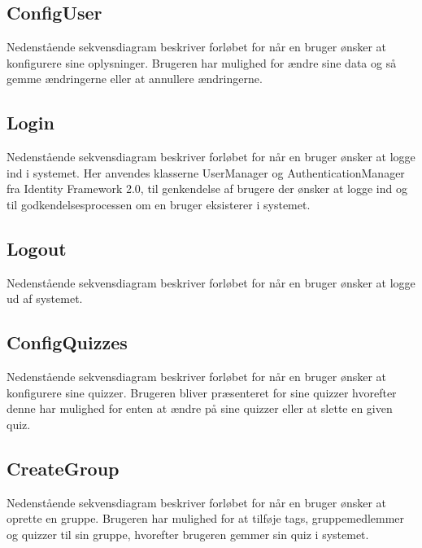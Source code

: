 
\subsection*{ConfigUser}
Nedenstående sekvensdiagram beskriver forløbet for når en bruger ønsker at konfigurere sine oplysninger. Brugeren har mulighed for ændre sine data og så gemme ændringerne eller at annullere ændringerne.


\subsection*{Login}
Nedenstående sekvensdiagram beskriver forløbet for når en bruger ønsker at logge ind i systemet. Her anvendes klasserne UserManager og AuthenticationManager fra Identity Framework 2.0, til genkendelse af brugere der ønsker at logge ind og til godkendelsesprocessen om en bruger eksisterer i systemet.


\subsection*{Logout}
Nedenstående sekvensdiagram beskriver forløbet for når en bruger ønsker at logge ud af systemet.


\subsection*{ConfigQuizzes}
Nedenstående sekvensdiagram beskriver forløbet for når en bruger ønsker at konfigurere sine quizzer. Brugeren bliver præsenteret for sine quizzer hvorefter denne har mulighed for enten at ændre på sine quizzer eller at slette en given quiz.


\subsection*{CreateGroup}
Nedenstående sekvensdiagram beskriver forløbet for når en bruger ønsker at oprette en gruppe. Brugeren har mulighed for at tilføje tags, gruppemedlemmer og quizzer til sin gruppe, hvorefter brugeren gemmer sin quiz i systemet.

